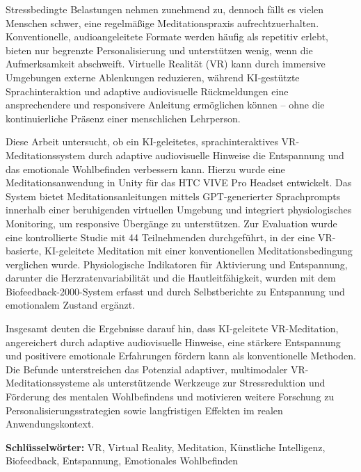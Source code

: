 Stressbedingte Belastungen nehmen zunehmend zu, dennoch fällt es vielen Menschen schwer, eine regelmäßige Meditationspraxis aufrechtzuerhalten. Konventionelle, audioangeleitete Formate werden häufig als repetitiv erlebt, bieten nur begrenzte Personalisierung und unterstützen wenig, wenn die Aufmerksamkeit abschweift. Virtuelle Realität (VR) kann durch immersive Umgebungen externe Ablenkungen reduzieren, während KI-gestützte Sprachinteraktion und adaptive audiovisuelle Rückmeldungen eine ansprechendere und responsivere Anleitung ermöglichen können – ohne die kontinuierliche Präsenz einer menschlichen Lehrperson.

Diese Arbeit untersucht, ob ein KI-geleitetes, sprachinteraktives VR-Meditationssystem durch adaptive audiovisuelle Hinweise die Entspannung und das emotionale Wohlbefinden verbessern kann. Hierzu wurde eine Meditationsanwendung in Unity für das HTC VIVE Pro Headset entwickelt. Das System bietet Meditationsanleitungen mittels GPT-generierter Sprachprompts innerhalb einer beruhigenden virtuellen Umgebung und integriert physiologisches Monitoring, um responsive Übergänge zu unterstützen. Zur Evaluation wurde eine kontrollierte Studie mit 44 Teilnehmenden durchgeführt, in der eine VR-basierte, KI-geleitete Meditation mit einer konventionellen Meditationsbedingung verglichen wurde. Physiologische Indikatoren für Aktivierung und Entspannung, darunter die Herzratenvariabilität und die Hautleitfähigkeit, wurden mit dem Biofeedback-2000-System erfasst und durch Selbstberichte zu Entspannung und emotionalem Zustand ergänzt.

Insgesamt deuten die Ergebnisse darauf hin, dass KI-geleitete VR-Meditation, angereichert durch adaptive audiovisuelle Hinweise, eine stärkere Entspannung und positivere emotionale Erfahrungen fördern kann als konventionelle Methoden. Die Befunde unterstreichen das Potenzial adaptiver, multimodaler VR-Meditationssysteme als unterstützende Werkzeuge zur Stressreduktion und Förderung des mentalen Wohlbefindens und motivieren weitere Forschung zu Personalisierungsstrategien sowie langfristigen Effekten im realen Anwendungskontext.

\vspace{1cm}
\textbf{Schlüsselwörter:} VR, Virtual Reality, Meditation, Künstliche Intelligenz, Biofeedback, Entspannung, Emotionales Wohlbefinden
